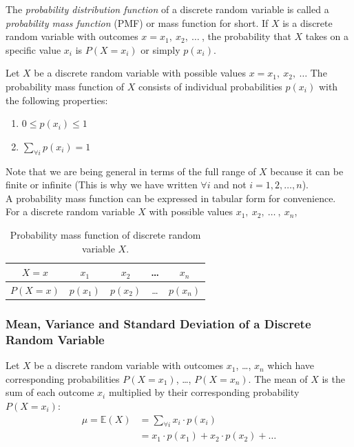 The \textit{probability distribution function} of a discrete random variable is called a 
\textit{probability mass function} (PMF) 
or mass function for short.
If $X$ is a discrete random variable with outcomes $x = x_{1},~x_{2},~\ldots~$, the probability that $X$ takes on a specific value $x_i$ is $P(X = x_{i})$ or simply  $p(x_{i})$.

\begin{properties}
Let $X$ be a discrete random variable with possible values $x = x_{1},~x_{2},~\ldots$ The probability mass function of $X$ consists of individual probabilities $p(x_i)$ with the following properties:
	\begin{enumerate}
	\item	$0 \leq p(x_{i}) \leq 1$ \\[0.5em]
	\item	$\displaystyle\sum_{\forall i} p(x_{i}) = 1 $
	\end{enumerate}
\end{properties}

\noindent
Note that we are being general in terms of the full range of $X$ because it can be finite or infinite (This is why we have written $\forall i$ and not $i = 1,2, \ldots, n$).\\

\noindent
A probability mass function can be expressed in tabular form for convenience. For a discrete random variable $X$ with possible values $x_1,~x_2,~\hdots~,~x_n$,

\begin{table}[h]
\begin{center}
\begin{tabular}{c|c|c|c|c}
\def\arraystretch{1.5}
$X=x$	&	$x_{1}$	&	$x_{2}$	&	\ldots	&	$x_{n}$	\\
\hline
$P(X=x)$	&	$p(x_{1})$	&	$p(x_{2})$	&	\ldots	&	$p(x_{n})$	\\
\end{tabular}
\caption{Probability mass function of discrete random variable $X$.}
\end{center}
\end{table}

\subsubsection{Mean, Variance and Standard Deviation of a Discrete Random Variable}

\begin{definition}
Let $X$ be a discrete random variable with outcomes $x_{1}$, \ldots, $x_{n}$
which have corresponding probabilities $P(X = x_{1})$, \ldots, $P(X = x_{n})$.
The mean of $X$ is the sum of each outcome $x_{i}$ multiplied by their corresponding probability $P(X=x_{i})$:
\begin{align}
\mu = \mathbb{E}(X) & = \displaystyle\sum_{\forall i} x_{i} \cdot p(x_{i}) \\
				& = x_{1} \cdot p(x_{1}) + x_{2} \cdot p(x_{2}) + \ldots
\end{align}
\end{definition}


